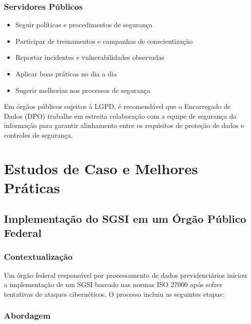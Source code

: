 \documentclass[12pt,a4paper]{report}
\begin{document}
\subsection{Servidores Públicos}

\begin{itemize}
  \item Seguir políticas e procedimentos de segurança
  \item Participar de treinamentos e campanhas de conscientização
  \item Reportar incidentes e vulnerabilidades observadas
  \item Aplicar boas práticas no dia a dia
  \item Sugerir melhorias nos processos de segurança
\end{itemize}

\begin{infobox}
Em órgãos públicos sujeitos à LGPD, é recomendável que o Encarregado de Dados (DPO) trabalhe em estreita colaboração com a equipe de segurança da informação para garantir alinhamento entre os requisitos de proteção de dados e controles de segurança.
\end{infobox}

\chapter{Estudos de Caso e Melhores Práticas}

\section{Implementação do SGSI em um Órgão Público Federal}

\subsection{Contextualização}

Um órgão federal responsável por processamento de dados previdenciários iniciou a implementação de um SGSI baseado nas normas ISO 27000 após sofrer tentativas de ataques cibernéticos. O processo incluiu as seguintes etapas:

\subsection{Abordagem}
\end{document}

